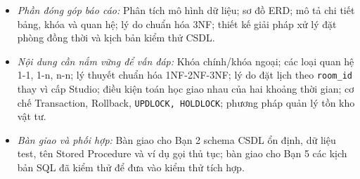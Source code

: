 \begin{enumerate}[leftmargin=1.5em]
\begin{itemize}[leftmargin=1.2em]
        \item \textit{Phần đóng góp báo cáo:} Phân tích mô hình dữ liệu; sơ đồ ERD; mô tả chi tiết bảng, khóa và quan hệ; lý do chuẩn hóa 3NF; thiết kế giải pháp xử lý đặt phòng đồng thời và kịch bản kiểm thử CSDL.
        \item \textit{Nội dung cần nắm vững để vấn đáp:} Khóa chính/khóa ngoại; các loại quan hệ 1-1, 1-n, n-n; lý thuyết chuẩn hóa 1NF-2NF-3NF; lý do đặt lịch theo \texttt{room\_id} thay vì cấp Studio; điều kiện toán học giao nhau của hai khoảng thời gian; cơ chế Transaction, Rollback, \texttt{UPDLOCK, HOLDLOCK}; phương pháp quản lý tồn kho vật tư.
        \item \textit{Bàn giao và phối hợp:} Bàn giao cho Bạn 2 schema CSDL ổn định, dữ liệu test, tên Stored Procedure và ví dụ gọi thủ tục; bàn giao cho Bạn 5 các kịch bản SQL đã kiểm thử để đưa vào kiểm thử tích hợp.
    \end{itemize}


\end{enumerate}
